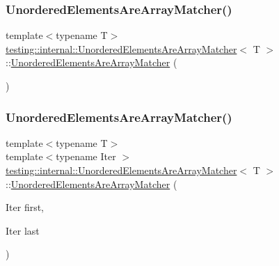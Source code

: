 \subsubsection{\texorpdfstring{Unordered\+Elements\+Are\+Array\+Matcher()}{UnorderedElementsAreArrayMatcher()}\hspace{0.1cm}{\footnotesize\ttfamily [1/2]}}
{\footnotesize\ttfamily template$<$typename T$>$ \\
\hyperlink{classtesting_1_1internal_1_1_unordered_elements_are_array_matcher}{testing\+::internal\+::\+Unordered\+Elements\+Are\+Array\+Matcher}$<$ T $>$\+::\hyperlink{classtesting_1_1internal_1_1_unordered_elements_are_array_matcher}{Unordered\+Elements\+Are\+Array\+Matcher} (\begin{DoxyParamCaption}{ }\end{DoxyParamCaption})\hspace{0.3cm}{\ttfamily [inline]}}

\mbox{\label{classtesting_1_1internal_1_1_unordered_elements_are_array_matcher_a5a91694cf5088cb0b7f4b1bb57dee957}} 
\subsubsection{\texorpdfstring{Unordered\+Elements\+Are\+Array\+Matcher()}{UnorderedElementsAreArrayMatcher()}\hspace{0.1cm}{\footnotesize\ttfamily [2/2]}}
{\footnotesize\ttfamily template$<$typename T$>$ \\
template$<$typename Iter $>$ \\
\hyperlink{classtesting_1_1internal_1_1_unordered_elements_are_array_matcher}{testing\+::internal\+::\+Unordered\+Elements\+Are\+Array\+Matcher}$<$ T $>$\+::\hyperlink{classtesting_1_1internal_1_1_unordered_elements_are_array_matcher}{Unordered\+Elements\+Are\+Array\+Matcher} (\begin{DoxyParamCaption}\item[{Iter}]{first,  }\item[{Iter}]{last }\end{DoxyParamCaption})\hspace{0.3cm}{\ttfamily [inline]}}



